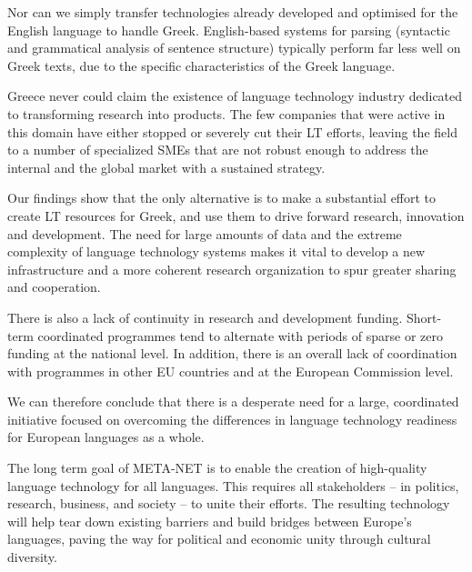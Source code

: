 \documentclass[]{../../metanetpaper}
\begin{document}
\begin{multicols}{2}
Nor can we simply transfer technologies already developed and optimised for the English language to handle Greek. English-based systems for parsing (syntactic and grammatical analysis of sentence structure) typically perform far less well on Greek texts, due to the specific characteristics of the Greek language.

Greece never could claim the existence of language technology industry dedicated to transforming research into products. The few companies that were active in this domain have either stopped or severely cut their LT efforts, leaving the field to a number of specialized SMEs that are not robust enough to address the internal and the global market with a sustained strategy. 

Our findings show that the only alternative is to make a substantial effort to create LT resources for Greek, and use them to drive forward research, innovation and development. The need for large amounts of data and the extreme complexity of language technology systems makes it vital to develop a new infrastructure and a more coherent research organization to spur greater sharing and cooperation.

There is also a lack of continuity in research and development funding. Short-term coordinated programmes tend to alternate with periods of sparse or zero funding at the national level. In addition, there is an overall lack of coordination with programmes in other EU countries and at the European Commission level.

We can therefore conclude that there is a desperate need for a large, coordinated initiative focused on overcoming the differences in language technology readiness for European languages as a whole.

The long term goal of META-NET is to enable the creation of high-quality language technology for all languages. This requires all stakeholders -- in politics, research, business, and society -- to unite their efforts. The resulting technology will help tear down existing barriers and build bridges between Europe’s languages, paving the way for political and economic unity through cultural diversity.  \end{multicols}

\clearpage
\end{document}

